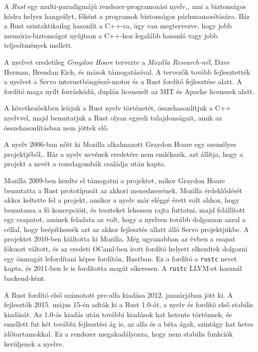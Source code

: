 \label{sec:rust}

A \textit{Rust} egy multi-paradigmájú rendszer-programozási nyelv,\cite{oldpage:main},
ami a biztonságos kódra helyez hangsúlyt, főként a programok biztonságos párhuzamosítására.\cite{mostlysafety, oldpage:faq:project}
Bár a Rust szintaktikailag hasonlít a C++-ra,\cite{rustvscpp} úgy van megtervezve, hogy jobb memória-biztonságot nyújtson a C++-hoz legalább hasonló vagy jobb teljesítmények mellett.

A nyelvet eredetileg \textit{Graydon Hoare} tervezte a \textit{Mozilla Research-nél}, Dave Herman, Brendan Eich, és mások támogatásával.\cite{rust:designedby}
A tervezők tovább fejlesztették a nyelvet a Servo internetböngésző-motor\cite{servo:ars, servo:mozilla} és a Rust fordító fejlesztése alatt.
A fordító maga nyílt forráskódú, duplán licenszelt az MIT és Apache licenszek alatt.

A következőekben leírjuk a Rust nyelv történetét, összehasonlítjuk a C++ nyelvvel,
majd bemutatjuk a Rust olyan egyedi tulajdonságait, amik az összehasonlításban nem jöttek elő.


A nyelv 2006-ban nőtt ki Mozilla alkalmazott Graydon Hoare egy személyes pro\-jekt\-jé\-ből,\cite{oldpage:faq:project}.
Bár a nyelv nevének eredetére nem emlékszik, azt állítja, hogy a projekt a nevét a rozsdagombák családja után kapta.\cite{rust:name}

Mozilla 2009-ben kezdte el támogatni a projektet, mikor Graydon Hoare bemutatta a Rust prototípusát az akkori menedzserének.\cite{interview:graydon} 
Mozilla érdeklődését akkor keltette fel a projekt, amikor a nyelv már eléggé érett volt ahhoz, hogy bemutassa a fő koncepcióit, és teszteket lehessen rajta futtatni,\cite{oldpage:faq:project} 
majd felállított egy csapatot, aminek feladata az volt, hogy a nyelven tovább dolgozzon azzal a céllal, hogy beépíthessék azt az akkor fejlesztés allatt álló Servo projektjükbe.\cite{oldpage:faq:project, interview:graydon}
A projektet 2010-ben kiáltotta ki Mozilla.\cite{talk:servo}
Még ugyanabban az évben a csapat fókuszt váltott, és az eredeti OCaml-ben írott fordító helyett elkezdtek dolgozni egy önmagát lefordítani képes fordítón, Rustban.\cite{rust:compilerwork}
Ez a fordító a \texttt{rustc} nevet kapta, és 2011-ben le is fordította magát sikeresen.\cite{rust:successful_compile} A \texttt{rustc} LLVM-et használ backend-ként.

A Rust fordító első számotott pre-alfa kiadása 2012. januárjában jött ki.\cite{rust:first_release}
A fejlesztők 2015. május 15-én adták ki a Rust 1.0-át, a nyelv és fordító első stabilis kiadását.\cite{rust:1_0:blog, rust:version_history}
Az 1.0-ás kiadás után további kiadások hat hetente történnek, és emellett fut két további fejlesztési ág is, az alfa és a béta ágak, szintúgy hat hetes időtartamokkal.\cite{rust:release_cycle}
Ez a rendszer megakadályozza, hogy nem stabilis funkciók kerüljenek a nyelve.\cite{rust:stability}

